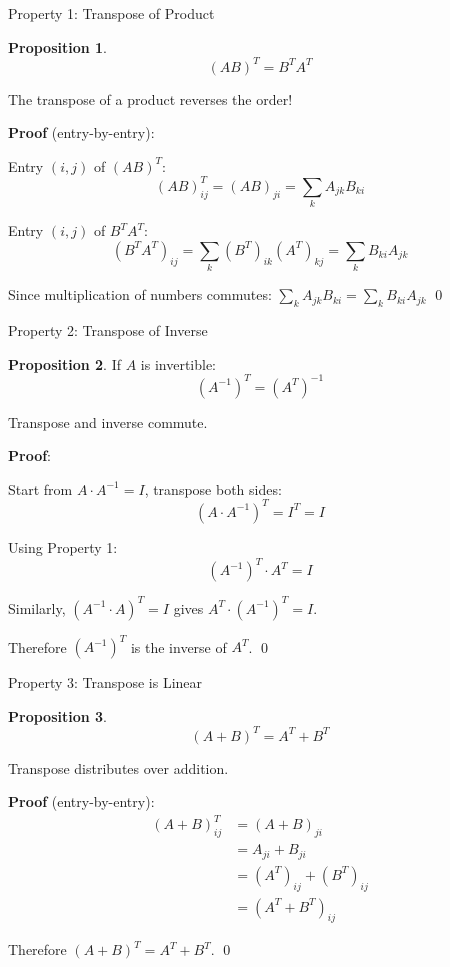 \documentclass[10pt]{beamer}
\theoremstyle{definition}
\newtheorem{prop}{Proposition}[section]
\newcommand{\x}[1]{\alert{\textbf{#1}}}
\begin{document}
\begin{frame}{Property 1: Transpose of Product}

\begin{prop}
$$(AB)^T = B^T A^T$$

The transpose of a product reverses the order!
\end{prop}

\vspace{1em}

\x{Proof} (entry-by-entry):

Entry $(i,j)$ of $(AB)^T$:
$$(AB)^T_{ij} = (AB)_{ji} = \sum_k A_{jk} B_{ki}$$

Entry $(i,j)$ of $B^T A^T$:
$$(B^T A^T)_{ij} = \sum_k (B^T)_{ik} (A^T)_{kj} = \sum_k B_{ki} A_{jk}$$

Since multiplication of numbers commutes: $\sum_k A_{jk} B_{ki} = \sum_k B_{ki} A_{jk}$ \qed

\end{frame}


\begin{frame}{Property 2: Transpose of Inverse}

\begin{prop}
If $A$ is invertible:
$$(A^{-1})^T = (A^T)^{-1}$$

Transpose and inverse commute.
\end{prop}

\vspace{1em}

\x{Proof}:

Start from $A \cdot A^{-1} = I$, transpose both sides:
$$(A \cdot A^{-1})^T = I^T = I$$

Using Property 1:
$$(A^{-1})^T \cdot A^T = I$$

Similarly, $(A^{-1} \cdot A)^T = I$ gives $A^T \cdot (A^{-1})^T = I$.

Therefore $(A^{-1})^T$ is the inverse of $A^T$. \qed

\end{frame}

\begin{frame}{Property 3: Transpose is Linear}

\begin{prop}
$$(A + B)^T = A^T + B^T$$

Transpose distributes over addition.
\end{prop}

\vspace{1em}

\x{Proof} (entry-by-entry):
\begin{align*}
(A + B)^T_{ij} &= (A + B)_{ji} \\
&= A_{ji} + B_{ji} \\
&= (A^T)_{ij} + (B^T)_{ij} \\
&= (A^T + B^T)_{ij}
\end{align*}

Therefore $(A + B)^T = A^T + B^T$. \qed

\end{frame}
\end{document}

